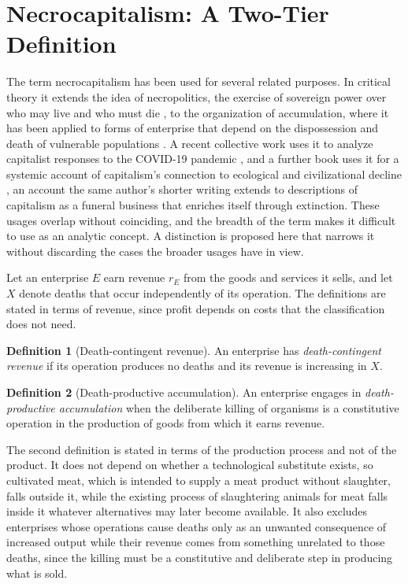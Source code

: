 \documentclass[11pt]{article}
\theoremstyle{definition}
\newtheorem{definition}{Definition}[section]
\theoremstyle{plain}
\theoremstyle{definition}
\begin{document}
\section{Necrocapitalism: A Two-Tier Definition}

The term necrocapitalism has been used for several related purposes. In critical theory it extends the idea of necropolitics, the exercise of sovereign power over who may live and who must die \cite{mbembe2003}, to the organization of accumulation, where it has been applied to forms of enterprise that depend on the dispossession and death of vulnerable populations \cite{banerjee2008}. A recent collective work uses it to analyze capitalist responses to the COVID-19 pandemic \cite{asma2021}, and a further book uses it for a systemic account of capitalism's connection to ecological and civilizational decline \cite{tsakraklides2023}, an account the same author's shorter writing extends to descriptions of capitalism as a funeral business that enriches itself through extinction. These usages overlap without coinciding, and the breadth of the term makes it difficult to use as an analytic concept. A distinction is proposed here that narrows it without discarding the cases the broader usages have in view.

Let an enterprise $E$ earn revenue $r_E$ from the goods and services it sells, and let $X$ denote deaths that occur independently of its operation. The definitions are stated in terms of revenue, since profit depends on costs that the classification does not need.

\begin{definition}[Death-contingent revenue]
An enterprise has \emph{death-contingent revenue} if its operation produces no deaths and its revenue is increasing in $X$.
\end{definition}

\begin{definition}[Death-productive accumulation]
An enterprise engages in \emph{death-productive accumulation} when the deliberate killing of organisms is a constitutive operation in the production of goods from which it earns revenue.
\end{definition}

The second definition is stated in terms of the production process and not of the product. It does not depend on whether a technological substitute exists, so cultivated meat, which is intended to supply a meat product without slaughter, falls outside it, while the existing process of slaughtering animals for meat falls inside it whatever alternatives may later become available. It also excludes enterprises whose operations cause deaths only as an unwanted consequence of increased output while their revenue comes from something unrelated to those deaths, since the killing must be a constitutive and deliberate step in producing what is sold.
\end{document}
